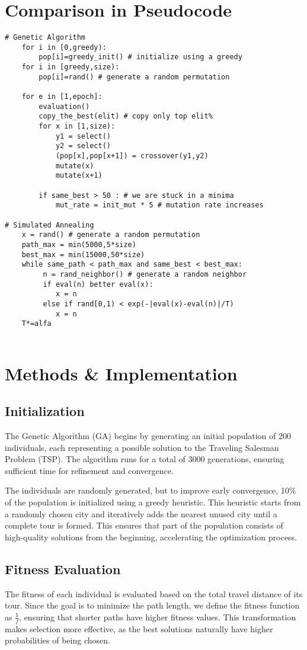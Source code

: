 \documentclass{article}
\begin{document}
\section{Comparison in Pseudocode}

\begin{lstlisting}
# Genetic Algorithm
	for i in [0,greedy):
		pop[i]=greedy_init() # initialize using a greedy
	for i in [greedy,size):
		pop[i]=rand() # generate a random permutation
		
	for e in [1,epoch]:
		evaluation()
		copy_the_best(elit) # copy only top elit%
		for x in [1,size): 
			y1 = select()
			y2 = select()
			(pop[x],pop[x+1]) = crossover(y1,y2)
			mutate(x)
			mutate(x+1)
			
		if same_best > 50 : # we are stuck in a minima
			mut_rate = init_mut * 5 # mutation rate increases

# Simulated Annealing
	x = rand() # generate a random permutation
	path_max = min(5000,5*size)
	best_max = min(15000,50*size)
	while same_path < path_max and same_best < best_max:
		 n = rand_neighbor() # generate a random neighbor
		 if eval(n) better eval(x):
		 	x = n
		 else if rand[0,1) < exp(-|eval(x)-eval(n)|/T)
		 	x = n
	T*=alfa 
		 
\end{lstlisting}


\pagebreak
\section{Methods \& Implementation}

\subsection{Initialization}  
The Genetic Algorithm (GA) begins by generating an initial population of 200 individuals, each representing a possible solution to the Traveling Salesman Problem (TSP). The algorithm runs for a total of 3000 generations, ensuring sufficient time for refinement and convergence.  

The individuals are randomly generated, but to improve early convergence, 10\% of the population is initialized using a greedy heuristic. This heuristic starts from a randomly chosen city and iteratively adds the nearest unused city until a complete tour is formed. This ensures that part of the population consists of high-quality solutions from the beginning, accelerating the optimization process.  

\subsection{Fitness Evaluation}
The fitness of each individual is evaluated based on the total travel distance of its tour. Since the goal is to minimize the path length, we define the fitness function as $\frac{1}{f}$, ensuring that shorter paths have higher fitness values. This transformation makes selection more effective, as the best solutions naturally have higher probabilities of being chosen.
\end{document}
